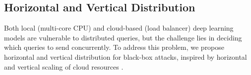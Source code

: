 







\subsection{Horizontal and Vertical Distribution}
\label{horizon_vertical}

Both local (multi-core CPU) and cloud-based (load balancer) deep learning models are vulnerable to distributed queries, but the challenge lies in deciding which queries to send concurrently. To address this problem, we propose horizontal and vertical distribution for black-box attacks, inspired by horizontal and vertical scaling of cloud resources \cite{Millnert2020}.

